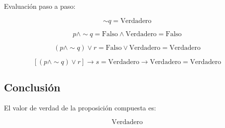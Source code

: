 \documentclass{article}
\begin{document}
	Evaluación paso a paso:
	
	
	\[
	\sim q = \text{Verdadero}
	\]
	
	
	
	
	\[
	p \land \sim q = \text{Falso} \land \text{Verdadero} = \text{Falso}
	\]
	
	
	
	
	\[
	(p \land \sim q) \lor r = \text{Falso} \lor \text{Verdadero} = \text{Verdadero}
	\]
	
	
	
	
	\[
	[(p \land \sim q) \lor r] \to s = \text{Verdadero} \to \text{Verdadero} = \text{Verdadero}
	\]
	
	
	
	\subsection*{Conclusión}
	El valor de verdad de la proposición compuesta es:
	
	
	\[
	\boxed{\text{Verdadero}}
	\]
	
	
	
\end{document}
